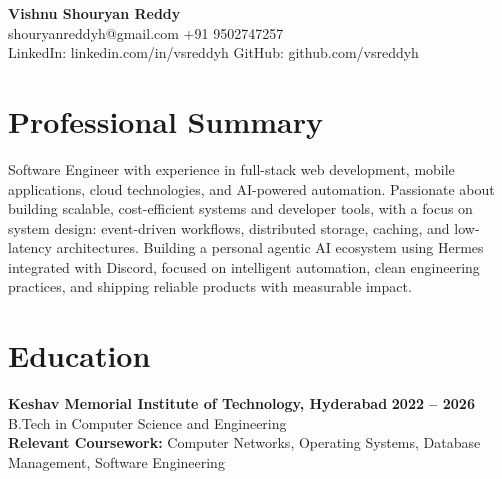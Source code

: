 \documentclass[a4paper,11pt]{article}
\newcommand{\resumeSubheading}[4]{%
  \textbf{#1} \hfill \textbf{#2} \\
{#3} \hfill {#4}
}
\begin{document}
\pagestyle{empty}
\raggedbottom
\addtolength{\textheight}{2\baselineskip}
\small

\begin{center}
  {\LARGE \textbf{Vishnu Shouryan Reddy}}\\[0.3em]
  shouryanreddyh@gmail.com \textbar{} +91 9502747257 \\[0.3em]
  LinkedIn: linkedin.com/in/vsreddyh \textbar{} GitHub: github.com/vsreddyh
\end{center}
\vspace{-0.8em}

\section*{Professional Summary}

Software Engineer with experience in full-stack web development, mobile applications, cloud technologies, and AI-powered automation. Passionate about building scalable, cost-efficient systems and developer tools, with a focus on system design: event-driven workflows, distributed storage, caching, and low-latency architectures. Building a personal agentic AI ecosystem using Hermes integrated with Discord, focused on intelligent automation, clean engineering practices, and shipping reliable products with measurable impact.

\section*{Education}

\resumeSubheading
{Keshav Memorial Institute of Technology, Hyderabad}{2022 -- 2026}
{B.Tech in Computer Science and Engineering}{} \\
\textbf{Relevant Coursework:} Computer Networks, Operating Systems, Database Management, Software Engineering


\end{document}
